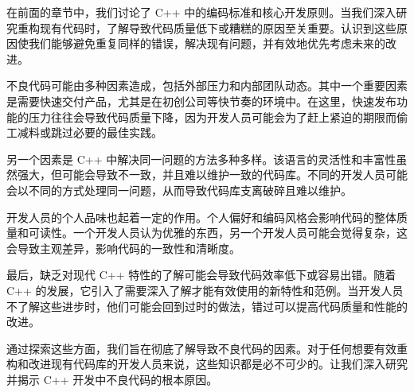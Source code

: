 在前面的章节中，我们讨论了 C++ 中的编码标准和核心开发原则。当我们深入研究重构现有代码时，了解导致代码质量低下或糟糕的原因至关重要。认识到这些原因使我们能够避免重复同样的错误，解决现有问题，并有效地优先考虑未来的改进。

不良代码可能由多种因素造成，包括外部压力和内部团队动态。其中一个重要因素是需要快速交付产品，尤其是在初创公司等快节奏的环境中。在这里，快速发布功能的压力往往会导致代码质量下降，因为开发人员可能会为了赶上紧迫的期限而偷工减料或跳过必要的最佳实践。

另一个因素是 C++ 中解决同一问题的方法多种多样。该语言的灵活性和丰富性虽然强大，但可能会导致不一致，并且难以维护一致的代码库。不同的开发人员可能会以不同的方式处理同一问题，从而导致代码库支离破碎且难以维护。

开发人员的个人品味也起着一定的作用。个人偏好和编码风格会影响代码的整体质量和可读性。一个开发人员认为优雅的东西，另一个开发人员可能会觉得复杂，这会导致主观差异，影响代码的一致性和清晰度。

最后，缺乏对现代 C++ 特性的了解可能会导致代码效率低下或容易出错。随着 C++ 的发展，它引入了需要深入了解才能有效使用的新特性和范例。当开发人员不了解这些进步时，他们可能会回到过时的做法，错过可以提高代码质量和性能的改进。

通过探索这些方面，我们旨在彻底了解导致不良代码的因素。对于任何想要有效重构和改进现有代码库的开发人员来说，这些知识都是必不可少的。让我们深入研究并揭示 C++ 开发中不良代码的根本原因。